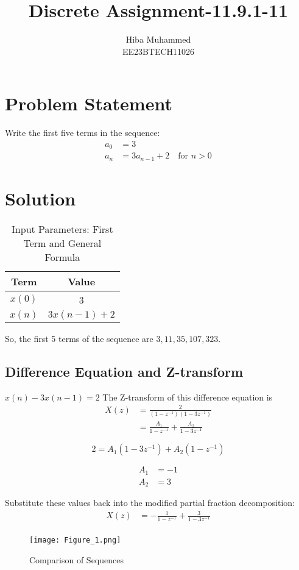 \documentclass[12pt]{article}
\title{Discrete Assignment-11.9.1-11}
\author{Hiba Muhammed \\
        EE23BTECH11026}
\date{}
\begin{document}
\maketitle

\section*{Problem Statement}
Write the first five terms in the sequence:
\begin{align}
a_{0}  &= 3 \\
a_{n}  &= 3a_{n-1} + 2 \quad \text{for } n > 0
\end{align}

\section*{Solution}
\begin{table}[h]
  \centering
  \caption{Input Parameters: First Term and General Formula}
  \begin{tabular}{|c|c|}
    \hline
    \textbf{Term} & \textbf{Value} \\
    \hline
    \(x(0)\) & 3 \\
    \(x(n)\) & \(3x(n-1) + 2\) \\
    \hline
  \end{tabular}
\end{table}


So, the first 5 terms of the sequence are \(3, 11, 35, 107, 323\).

\subsection*{Difference Equation and Z-transform}
\(x(n) - 3x(n-1) = 2\) 
The Z-transform of this difference equation is
\begin{align}
X(z) &= \frac{2}{(1 - z^{-1})(1 - 3z^{-1})}\\
&= \frac{A_1}{1 - z^{-1}} + \frac{A_2}{1 - 3z^{-1}}
\end{align}

\begin{equation}
2 = A_1(1-3z^{-1}) + A_2(1-z^{-1})
\end{equation}

\begin{align}
A_1 &= -1 \\
A_2 &= 3
\end{align}

Substitute these values back into the modified partial fraction decomposition:
\begin{align*}
X(z) &= -\frac{1}{1-z^{-1}} + \frac{3}{1-3z^{-1}} \\
\end{align*}



\begin{figure}[h]
    \centering
    \texttt{[image: Figure\_1.png]}
    \caption{Comparison of Sequences}
    \label{fig:comparison}
\end{figure}
\end{document}
